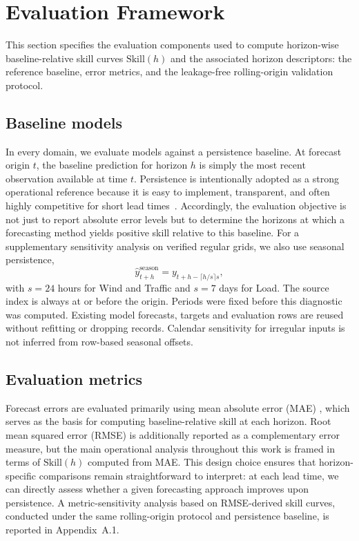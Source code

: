 \documentclass[pdflatex,sn-mathphys]{sn-jnl}
\begin{document}
\section{Evaluation Framework}\label{sec:framework}
This section specifies the evaluation components used to compute horizon-wise baseline-relative skill curves $\mathrm{Skill}(h)$ and the associated horizon descriptors: the reference baseline, error metrics, and the leakage-free rolling-origin validation protocol.
\subsection{Baseline models}
In every domain, we evaluate models against a persistence baseline. At forecast origin $t$, the baseline prediction for horizon $h$ is simply the most recent observation available at time $t$. Persistence is intentionally adopted as a strong operational reference because it is easy to implement, transparent, and often highly competitive for short lead times~\citep{murphy1993,hyndman2018}. Accordingly, the evaluation objective is not just to report absolute error levels but to determine the horizons at which a forecasting method yields positive skill relative to this baseline.
For a supplementary sensitivity analysis on verified regular grids, we also
use seasonal persistence,
\begin{equation}
\hat y^{\mathrm{season}}_{t+h}=y_{t+h-\lceil h/s\rceil s},
\end{equation}
with $s=24$ hours for Wind and Traffic and $s=7$ days for Load. The source
index is always at or before the origin. Periods were fixed before this
diagnostic was computed. Existing model forecasts, targets and evaluation
rows are reused without refitting or dropping records. Calendar sensitivity
for irregular inputs is not inferred from row-based seasonal offsets.
\subsection{Evaluation metrics}
Forecast errors are evaluated primarily using mean absolute error (MAE) \citep{hyndman2006}, which serves as the basis for computing baseline-relative skill at each horizon. Root mean squared error (RMSE) is additionally reported as a complementary error measure, but the main operational analysis throughout this work is framed in terms of $\mathrm{Skill}(h)$ computed from MAE. This design choice ensures that horizon-specific comparisons remain straightforward to interpret: at each lead time, we can directly assess whether a given forecasting approach improves upon persistence. A metric-sensitivity analysis based on RMSE-derived skill curves, conducted under the same rolling-origin protocol and persistence baseline, is reported in Appendix~A.1.
\end{document}
